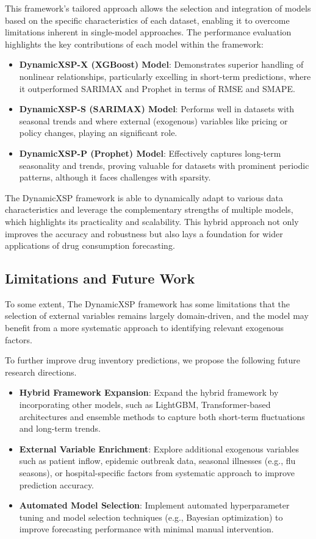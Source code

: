\documentclass[journal]{IEEEtran}
\begin{document}
This framework's tailored approach allows the selection and integration of models based on the specific characteristics of each dataset, enabling it to overcome limitations inherent in single-model approaches. The performance evaluation highlights the key contributions of each model within the framework:

\begin{itemize} 
    \item \textbf{DynamicXSP-X (XGBoost) Model}: Demonstrates superior handling of nonlinear relationships, particularly excelling in short-term predictions, where it outperformed SARIMAX and Prophet in terms of RMSE and SMAPE. 
    \item \textbf{DynamicXSP-S (SARIMAX) Model}: Performs well in datasets with seasonal trends and where external (exogenous) variables like pricing or policy changes, playing an significant role. 
    \item \textbf{DynamicXSP-P (Prophet) Model}: Effectively captures long-term seasonality and trends, proving valuable for datasets with prominent periodic patterns, although it faces challenges with sparsity. \end{itemize}

The DynamicXSP framework is able to dynamically adapt to various data characteristics and leverage the complementary strengths of multiple models, which highlights its practicality and scalability. This hybrid approach not only improves the accuracy and robustness but also lays a foundation for wider applications of drug consumption forecasting.

\subsection{Limitations and Future Work}
To some extent, The DynamicXSP framework has some limitations that the selection of external variables remains largely domain-driven, and the model may benefit from a more systematic approach to identifying relevant exogenous factors. 

To further improve drug inventory predictions, we propose the following future research directions. 
\begin{itemize}
    \item \textbf{Hybrid Framework Expansion}: Expand the hybrid framework by incorporating other models, such as LightGBM, Transformer-based architectures and ensemble methods to capture both short-term fluctuations and long-term trends.
    \item \textbf{External Variable Enrichment}: Explore additional exogenous variables such as patient inflow, epidemic outbreak data, seasonal illnesses (e.g., flu seasons), or hospital-specific factors from systematic approach to improve prediction accuracy.
    \item \textbf{Automated Model Selection}: Implement automated hyperparameter tuning and model selection techniques (e.g., Bayesian optimization) to improve forecasting performance with minimal manual intervention.
\end{itemize}
\end{document}
